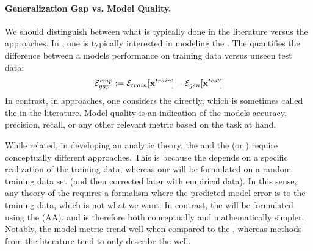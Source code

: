 \paragraph{Generalization Gap vs. Model Quality.}
\label{sxn:SMOG_main-model_quality}
We should distinguish between what is typically done in the \SLT literature versus the \STATMECH approaches.
In \SLT, one is typically interested in modeling the \emph{\GeneralizationGap}.
The \GeneralizationGap quantifies the difference between a models performance on training data versus unseen test data:
\begin{align}
  \label{eqn:gen_gap}
  \mathcal{E}^{emp}_{gap}:= {\mathcal{E}}_{train}[\mathbf{x}^{train}]- {\mathcal{E}}_{gen}[\mathbf{x}^{test}]
\end{align}
In contrast, in \STATMECH approaches, one considers the \ModelGeneralizationError directly,
which is sometimes called the \ModelQuality in the \SLT literature.
Model quality is an indication of the models accuracy, precision, recall, or any other relevant metric based on the task at hand.

While related, in developing an analytic theory, the \GeneralizationGap and
the \ModelQuality (or \ModelGeneralizationError) require conceptually different approaches.
This is because the \GeneralizationGap depends on a specific realization of the training data,
whereas our \ModelGeneralizationError will be formulated on a random training data set
(and then corrected later with empirical data).
In this sense, any theory of the \GeneralizationGap  requires a formalism where the
predicted model error is \Quenched to the training data, which is not what we want.
In contrast, the \ModelGeneralizationError  will be formulated using the \AnnealedApproximation (AA),
and is therefore both conceptually and mathematically simpler.
Notably, the \HTSR model \Quality metric trend well when compared to the \ModelGeneralizationError ,
whereas methods from the \SLT literature tend to only describe the \GeneralizationGap well.\cite{YTHx23_KDD}
